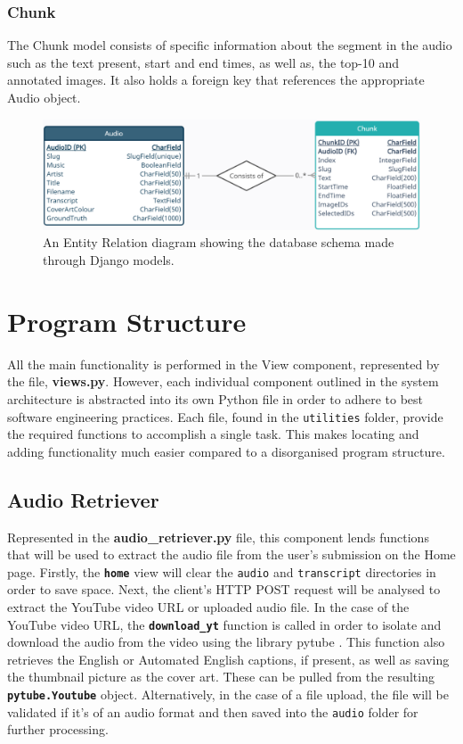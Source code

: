 \documentclass{l4proj}
\begin{document}
\subsubsection{Chunk}
The Chunk model consists of specific information about the segment in the audio such as the text present, start and end times, as well as, the top-10 and annotated images. It also holds a foreign key that references the appropriate Audio object.

\begin{figure}
    \centering
    \includegraphics[width=1\textwidth]{figures/models_schema.pdf}
    \caption{An Entity Relation diagram showing the database schema made through Django models.}
    \label{fig:models_schema}
\end{figure}


\section{Program Structure}
All the main functionality is performed in the View component, represented by the file, \textbf{views.py}. However, each individual component outlined in the system architecture is abstracted into its own Python file in order to adhere to best software engineering practices. Each file, found in the \lstinline|utilities| folder, provide the required functions to accomplish a single task. This makes locating and adding functionality much easier compared to a disorganised program structure.

\subsection{Audio Retriever}
Represented in the \textbf{audio\_retriever.py} file, this component lends functions that will be used to extract the audio file from the user's submission on the Home page. Firstly, the \textbf{\lstinline|home|} view will clear the \lstinline|audio| and \lstinline|transcript| directories in order to save space. Next, the client's HTTP POST request will be analysed to extract the YouTube video URL or uploaded audio file. In the case of the YouTube video URL, the \textbf{\lstinline|download_yt|} function is called in order to isolate and download the audio from the video using the library pytube \citep{pytube}. This function also retrieves the English or Automated English captions, if present, as well as saving the thumbnail picture as the cover art. These can be pulled from the resulting \textbf{\lstinline|pytube.Youtube|} object. Alternatively, in the case of a file upload, the file will be validated if it's of an audio format and then saved into the \lstinline|audio| folder for further processing.
\end{document}
